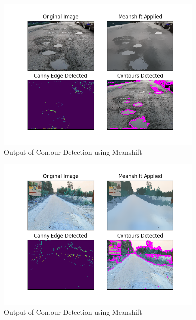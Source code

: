 \documentclass[12pt,a4paper]{article}
\begin{document}
\begin{itemize}



    \begin{figure}[ht!]
        \centering
        \includegraphics[width = 4in]{images/meanshift_2.png}
        \caption{Output of Contour Detection using Meanshift}
    \end{figure}

\newpage
\newpage
    



    \begin{figure}[ht!]
        \centering
        \includegraphics[width = 4in]{images/meanshift_1.png}
        \caption{Output of Contour Detection using Meanshift}
    \end{figure}


\end{itemize}
\end{document}
